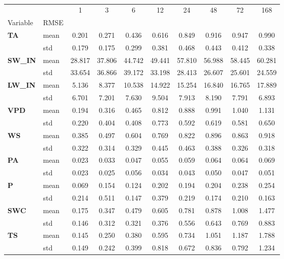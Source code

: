 \begin{table}
\centering
\caption{\CapGapLen}
\label{gap_len}
\begin{tabular}{p{2.1cm}l|cccccccc}
\toprule
 &  & 1 & 3 & 6 & 12 & 24 & 48 & 72 & 168 \\
Variable & RMSE &  &  &  &  &  &  &  &  \\
\midrule
\multirow[c]{2}{*}{\parbox{2.1cm}{\textbf{TA}}} & mean & 0.201 & 0.271 & 0.436 & 0.616 & 0.849 & 0.916 & 0.947 & 0.990 \\
 & std & 0.179 & 0.175 & 0.299 & 0.381 & 0.468 & 0.443 & 0.412 & 0.338 \\
\cline{1-10}
\multirow[c]{2}{*}{\parbox{2.1cm}{\textbf{SW\_IN}}} & mean & 28.817 & 37.806 & 44.742 & 49.441 & 57.810 & 56.988 & 58.445 & 60.281 \\
 & std & 33.654 & 36.866 & 39.172 & 33.198 & 28.413 & 26.607 & 25.601 & 24.559 \\
\cline{1-10}
\multirow[c]{2}{*}{\parbox{2.1cm}{\textbf{LW\_IN}}} & mean & 5.136 & 8.377 & 10.538 & 14.922 & 15.254 & 16.840 & 16.765 & 17.889 \\
 & std & 6.701 & 7.201 & 7.630 & 9.504 & 7.913 & 8.190 & 7.791 & 6.893 \\
\cline{1-10}
\multirow[c]{2}{*}{\parbox{2.1cm}{\textbf{VPD}}} & mean & 0.194 & 0.316 & 0.465 & 0.812 & 0.888 & 0.991 & 1.040 & 1.131 \\
 & std & 0.220 & 0.404 & 0.408 & 0.773 & 0.592 & 0.619 & 0.581 & 0.650 \\
\cline{1-10}
\multirow[c]{2}{*}{\parbox{2.1cm}{\textbf{WS}}} & mean & 0.385 & 0.497 & 0.604 & 0.769 & 0.822 & 0.896 & 0.863 & 0.918 \\
 & std & 0.322 & 0.314 & 0.329 & 0.445 & 0.463 & 0.388 & 0.326 & 0.318 \\
\cline{1-10}
\multirow[c]{2}{*}{\parbox{2.1cm}{\textbf{PA}}} & mean & 0.023 & 0.033 & 0.047 & 0.055 & 0.059 & 0.064 & 0.064 & 0.069 \\
 & std & 0.023 & 0.025 & 0.056 & 0.034 & 0.043 & 0.050 & 0.047 & 0.051 \\
\cline{1-10}
\multirow[c]{2}{*}{\parbox{2.1cm}{\textbf{P}}} & mean & 0.069 & 0.154 & 0.124 & 0.202 & 0.194 & 0.204 & 0.238 & 0.254 \\
 & std & 0.214 & 0.511 & 0.147 & 0.379 & 0.219 & 0.174 & 0.210 & 0.163 \\
\cline{1-10}
\multirow[c]{2}{*}{\parbox{2.1cm}{\textbf{SWC}}} & mean & 0.175 & 0.347 & 0.479 & 0.605 & 0.781 & 0.878 & 1.008 & 1.477 \\
 & std & 0.146 & 0.312 & 0.321 & 0.376 & 0.556 & 0.643 & 0.769 & 0.883 \\
\cline{1-10}
\multirow[c]{2}{*}{\parbox{2.1cm}{\textbf{TS}}} & mean & 0.145 & 0.250 & 0.380 & 0.595 & 0.734 & 1.051 & 1.187 & 1.788 \\
 & std & 0.149 & 0.242 & 0.399 & 0.818 & 0.672 & 0.836 & 0.792 & 1.234 \\
\cline{1-10}
\bottomrule
\end{tabular}
\end{table}

